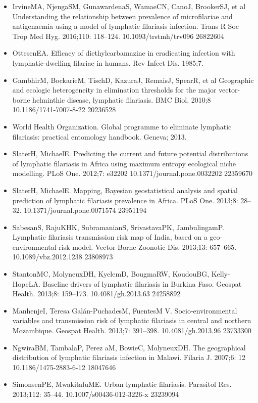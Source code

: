\documentclass[11pt,a4paper]{article}
\begin{document}
\begin{itemize}
\item IrvineMA, NjengaSM, GunawardenaS, WamaeCN, CanoJ, BrookerSJ, et al Understanding the relationship between prevalence of microfilariae and antigenaemia using a model of lymphatic filariasis infection. Trans R Soc Trop Med Hyg. 2016;110: 118–124. 10.1093/trstmh/trv096 26822604
\item OttesenEA. Efficacy of diethylcarbamazine in eradicating infection with lymphatic-dwelling filariae in humans. Rev Infect Dis. 1985;7.
\item GambhirM, BockarieM, TischD, KazuraJ, RemaisJ, SpearR, et al Geographic and ecologic heterogeneity in elimination thresholds for the major vector-borne helminthic disease, lymphatic filariasis. BMC Biol. 2010;8 10.1186/1741-7007-8-22 20236528
\item World Health Organization. Global programme to eliminate lymphatic filariasis: practical entomology handbook. Geneva; 2013.
\item SlaterH, MichaelE. Predicting the current and future potential distributions of lymphatic filariasis in Africa using maximum entropy ecological niche modelling. PLoS One. 2012;7: e32202 10.1371/journal.pone.0032202 22359670
\item SlaterH, MichaelE. Mapping, Bayesian geostatistical analysis and spatial prediction of lymphatic filariasis prevalence in Africa. PLoS One. 2013;8: 28–32. 10.1371/journal.pone.0071574 23951194
\item SabesanS, RajuKHK, SubramanianS, SrivastavaPK, JambulingamP. Lymphatic filariasis transmission risk map of India, based on a geo-environmental risk model. Vector-Borne Zoonotic Dis. 2013;13: 657–665. 10.1089/vbz.2012.1238 23808973
\item StantonMC, MolyneuxDH, KyelemD, BougmaRW, KoudouBG, Kelly-HopeLA. Baseline drivers of lymphatic filariasis in Burkina Faso. Geospat Health. 2013;8: 159–173. 10.4081/gh.2013.63 24258892
\item ManhenjeI, Teresa Galán-PuchadesM, FuentesM V. Socio-environmental variables and transmission risk of lymphatic filariasis in central and northern Mozambique. Geospat Health. 2013;7: 391–398. 10.4081/gh.2013.96 23733300
\item NgwiraBM, TambalaP, Perez aM, BowieC, MolyneuxDH. The geographical distribution of lymphatic filariasis infection in Malawi. Filaria J. 2007;6: 12 10.1186/1475-2883-6-12 18047646
\item SimonsenPE, MwakitaluME. Urban lymphatic filariasis. Parasitol Res. 2013;112: 35–44. 10.1007/s00436-012-3226-x 23239094

\end{itemize}
\end{document}
